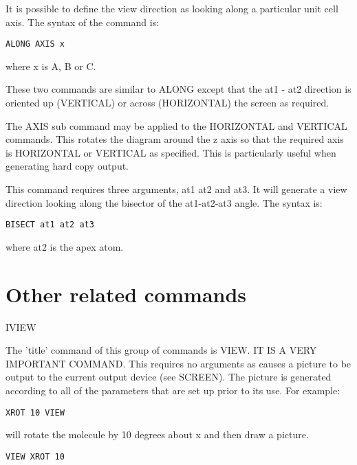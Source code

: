 \documentclass[10pt,a4paper]{report}
\begin{document}
\bigskip{}


It is possible to define the view direction as looking along
a
particular unit cell axis. The syntax of the command is:
\small\begin{verbatim}
ALONG AXIS x
\end{verbatim}\normalsize


where x is A, B or C.


\bigskip{}




\bigskip{}




These two commands are similar to ALONG except that the at1 -
at2
direction is oriented up (VERTICAL) or across (HORIZONTAL) the
screen
as required.


\bigskip{}


The AXIS sub command may be applied to the HORIZONTAL and VERTICAL 
commands. This rotates the diagram around the z axis so that the 
required axis is HORIZONTAL or VERTICAL as specified. This is 
particularly useful when generating hard copy output.


\bigskip{}




This command requires three arguments, at1 at2 and at3. It will
generate a view direction looking along the bisector of the
at1-at2-at3
angle. The syntax is:
\small\begin{verbatim}
BISECT at1 at2 at3
\end{verbatim}\normalsize


where at2 is the apex atom.
\section{Other related commands}


IVIEW


The 'title' command of this group of commands is VIEW. IT IS A VERY IMPORTANT COMMAND.  This
requires
no arguments as causes a picture to be output to the current
output
device (see SCREEN). The picture is generated according to all
of the
parameters that are set up prior to its use. For example:
\small\begin{verbatim}
XROT 10 VIEW
\end{verbatim}\normalsize


will rotate the molecule by 10 degrees about x and then draw a
picture.
\small\begin{verbatim}
VIEW XROT 10
\end{verbatim}\normalsize
\end{document}
